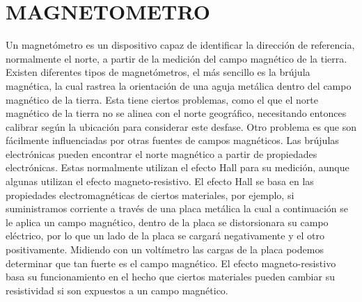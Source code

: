 \documentclass{article}
\begin{document}
 
\section*{MAGNETOMETRO}
Un magnetómetro es un dispositivo capaz de identificar la dirección de referencia, normalmente el norte, a partir de la medición del campo magnético de la tierra.
Existen diferentes tipos de magnetómetros, el más sencillo es la brújula magnética, la cual rastrea la orientación de una aguja metálica dentro del campo magnético de la tierra. Esta tiene ciertos problemas, como el que el norte magnético de la tierra no se alinea con el norte geográfico, necesitando entonces calibrar según la ubicación para considerar este desfase. Otro problema es que son fácilmente influenciadas por otras fuentes de campos magnéticos. 
Las brújulas electrónicas pueden encontrar el norte magnético a partir de propiedades electrónicas. Estas normalmente utilizan el efecto Hall para su medición, aunque algunas utilizan el efecto magneto-resistivo.
El efecto Hall se basa en las propiedades electromagnéticas de ciertos materiales, por ejemplo, si suministramos corriente a través de una placa metálica la cual a continuación se le aplica un campo magnético, dentro de la placa se distorsionara su campo eléctrico, por lo que un lado de la placa se cargará negativamente y el otro positivamente. Midiendo con un voltímetro las cargas de la placa podemos determinar que tan fuerte es el campo magnético.
El efecto magneto-resistivo basa su funcionamiento en el hecho que ciertos materiales pueden cambiar su resistividad si son expuestos a un campo magnético.
\end{document}
